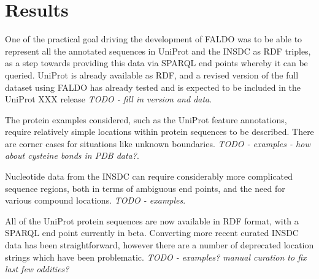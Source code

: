 \section*{Results}
One of the practical goal driving the development of FALDO was to be able
to represent all the annotated sequences in UniProt and the INSDC as RDF
triples, as a step towards providing this data via SPARQL end points whereby
it can be queried.
UniProt is already available as RDF, and a revised version of the full
dataset using FALDO has already tested and is expected to be included
in the UniProt XXX release \textit{TODO - fill in version and data}.

The protein examples considered, such as the UniProt feature annotations,
require relatively simple locations within protein sequences to be described.
There are corner cases for situations like unknown boundaries.
\textit{TODO - examples - how about cysteine bonds in PDB data?}.

Nucleotide data from the INSDC can require considerably more complicated
sequence regions, both in terms of ambiguous end points, and the need for
various compound locations.
\textit{TODO - examples}.

All of the UniProt protein sequences are now available in RDF format,
with a SPARQL end point currently in beta. Converting more recent
curated INSDC data has been straightforward, however there are a
number of deprecated location strings which have been problematic.
\textit{TODO - examples? manual curation to fix last few oddities?}

